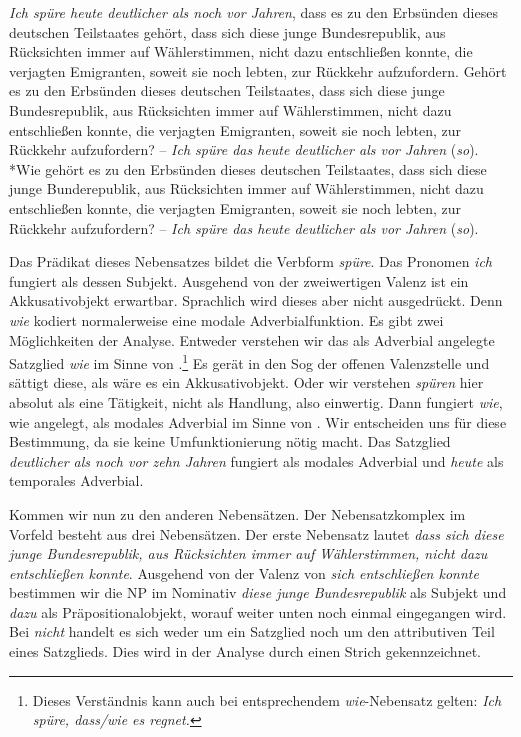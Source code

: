 \ea \label{ea:Mayer_Satz_KAdv_Tests}
\ea \label{ea:Mayer_Satz_KGlied_HS} \textit{Ich spüre heute deutlicher als noch vor Jahren}, dass es zu den Erbsünden dieses deutschen Teilstaates gehört, dass sich diese junge Bundesrepublik, aus Rücksichten immer auf Wählerstimmen, nicht dazu entschließen konnte, die verjagten Emigranten, soweit sie noch lebten, zur Rückkehr aufzufordern.
\ex \label{ex:Mayer_Satz_KGlied_antwort} Gehört es zu den Erbsünden dieses deutschen Teilstaates, dass sich diese junge Bundesrepublik, aus Rücksichten immer auf Wählerstimmen, nicht dazu entschließen konnte, die verjagten Emigranten, soweit sie noch lebten, zur Rückkehr aufzufordern? – \textit{Ich spüre das heute deutlicher als vor Jahren} (\textit{so}).
\ex \label{ex:Mayer_Satz_KGlied_Frage} *Wie gehört es zu den Erbsünden dieses deutschen Teilstaates, dass sich diese junge Bunderepublik, aus Rücksichten immer auf Wählerstimmen, nicht dazu entschließen konnte, die verjagten Emigranten, soweit sie noch lebten, zur Rückkehr aufzufordern? – \textit{Ich spüre das heute deutlicher als vor Jahren} (\textit{so}). 
\z 
\z 

Das Prädikat dieses Nebensatzes bildet die Verbform \textit{spüre}. Das Pronomen \textit{ich} fungiert als dessen Subjekt. Ausgehend von der zweiwertigen Valenz ist ein Akkusativobjekt erwartbar. Sprachlich wird dieses aber nicht ausgedrückt. Denn \textit{wie} kodiert normalerweise eine modale Adverbialfunktion. Es gibt zwei Möglichkeiten der Analyse. Entweder verstehen wir das als Adverbial angelegte Satzglied \textit{wie} im Sinne von .\footnote{Dieses Verständnis kann auch bei entsprechendem \textit{wie}-Nebensatz gelten: \textit{Ich spüre, dass/wie es regnet.}} Es gerät in den Sog der offenen Valenzstelle und sättigt diese, als wäre es ein Akkusativobjekt. Oder wir verstehen \textit{spüren} hier absolut als eine Tätigkeit, nicht als Handlung, also einwertig. Dann fungiert \textit{wie}, wie angelegt, als modales Adverbial im Sinne von . Wir entscheiden uns für diese Bestimmung, da sie keine Umfunktionierung nötig macht. Das Satzglied \textit{deutlicher als noch vor zehn Jahren} fungiert als modales Adverbial und \textit{heute} als temporales Adverbial. 

Kommen wir nun zu den anderen Nebensätzen. Der Nebensatzkomplex im Vorfeld besteht aus drei Nebensätzen. Der erste Nebensatz lautet \textit{dass sich diese junge Bundesrepublik, aus Rücksichten immer auf Wählerstimmen, nicht dazu entschließen konnte}. Ausgehend von der Valenz von \textit{sich entschließen konnte} bestimmen wir die NP im Nominativ \textit{diese junge Bundesrepublik} als Subjekt und \textit{dazu} als Präpositionalobjekt, worauf weiter unten noch einmal eingegangen wird. Bei \textit{nicht} handelt es sich weder um ein Satzglied noch um den attributiven Teil eines Satzglieds. Dies wird in der Analyse durch einen Strich gekennzeichnet. 

